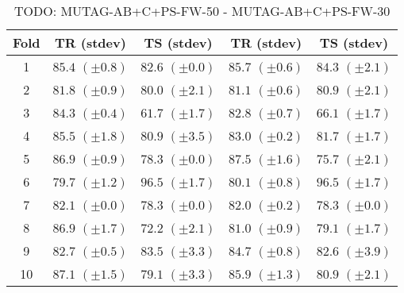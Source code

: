 \documentclass[10pt,a4paper]{book}
\begin{document}
\begin{table}[tbph]
\caption{TODO: MUTAG-AB+C+PS-FW-50 - MUTAG-AB+C+PS-FW-30}
\label{TODO}
\centering
\begin{tabular}{c*{4}{c}}
\toprule
Fold & TR (stdev) & TS (stdev) & TR (stdev) & TS (stdev)\\
\midrule
1 & $85.4$ $(\pm 0.8)$ & $82.6$ $(\pm 0.0)$ & $85.7$ $(\pm 0.6)$ & $84.3$ $(\pm 2.1)$\\
2 & $81.8$ $(\pm 0.9)$ & $80.0$ $(\pm 2.1)$ & $81.1$ $(\pm 0.6)$ & $80.9$ $(\pm 2.1)$\\
3 & $84.3$ $(\pm 0.4)$ & $61.7$ $(\pm 1.7)$ & $82.8$ $(\pm 0.7)$ & $66.1$ $(\pm 1.7)$\\
4 & $85.5$ $(\pm 1.8)$ & $80.9$ $(\pm 3.5)$ & $83.0$ $(\pm 0.2)$ & $81.7$ $(\pm 1.7)$\\
5 & $86.9$ $(\pm 0.9)$ & $78.3$ $(\pm 0.0)$ & $87.5$ $(\pm 1.6)$ & $75.7$ $(\pm 2.1)$\\
6 & $79.7$ $(\pm 1.2)$ & $96.5$ $(\pm 1.7)$ & $80.1$ $(\pm 0.8)$ & $96.5$ $(\pm 1.7)$\\
7 & $82.1$ $(\pm 0.0)$ & $78.3$ $(\pm 0.0)$ & $82.0$ $(\pm 0.2)$ & $78.3$ $(\pm 0.0)$\\
8 & $86.9$ $(\pm 1.7)$ & $72.2$ $(\pm 2.1)$ & $81.0$ $(\pm 0.9)$ & $79.1$ $(\pm 1.7)$\\
9 & $82.7$ $(\pm 0.5)$ & $83.5$ $(\pm 3.3)$ & $84.7$ $(\pm 0.8)$ & $82.6$ $(\pm 3.9)$\\
10 & $87.1$ $(\pm 1.5)$ & $79.1$ $(\pm 3.3)$ & $85.9$ $(\pm 1.3)$ & $80.9$ $(\pm 2.1)$\\
\bottomrule
\end{tabular}
\end{table}




%
%
\end{document}
